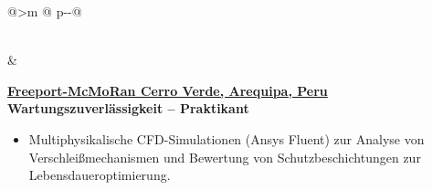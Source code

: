 \begin{tabular}{@{}>{\raggedleft\arraybackslash}m{\datecol} @{\hspace{\colgap}} p{\dimexpr\textwidth-\datecol-\colgap\relax}@{}}
\begin{minipage}[t]{\linewidth}
\begin{expblock}
\begin{itemize}[nosep,leftmargin=1em]
  \end{itemize}
\end{expblock}
\end{minipage}

\\[-0.5em]

 &
\begin{minipage}[t]{\linewidth}\vspace{0pt}
\begin{expblock}
  \footnotesize
  \setlength{\parindent}{0pt}\setlength{\parskip}{0pt}
    \textbf{\href{https://www.fcx.com}{Freeport-McMoRan Cerro Verde, Arequipa, Peru}}\\[-0.1em]
  \textbf{Wartungszuverlässigkeit – Praktikant}\\[-1em]
  \begin{itemize}[nosep,leftmargin=1em]
    \item Multiphysikalische CFD-Simulationen (Ansys Fluent) zur Analyse von Verschleißmechanismen und Bewertung von Schutzbeschichtungen zur Lebensdaueroptimierung.
 
  \end{itemize}
\end{expblock}
\end{minipage}

\end{tabular}